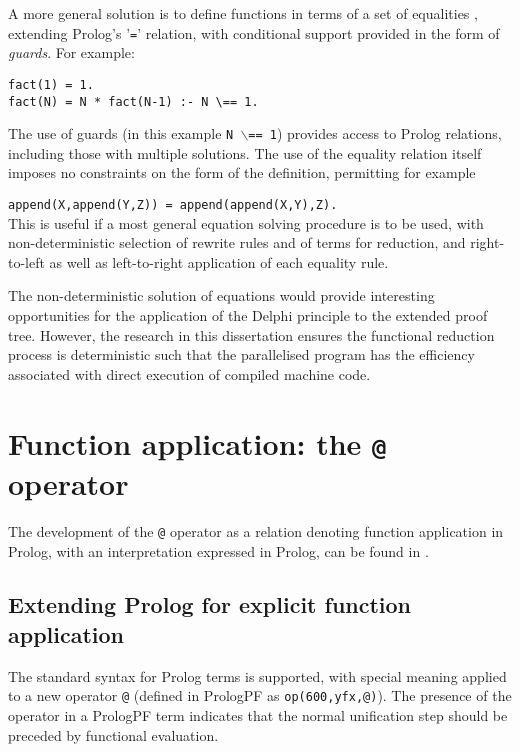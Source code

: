 A more general solution is to define functions in terms of a set of
equalities \cite{Han94, Nai91},
extending Prolog's '\texttt{=}' relation, with conditional
support provided in the form of \textit{guards}.  For example:

\begin{verbatim}
fact(1) = 1.
fact(N) = N * fact(N-1) :- N \== 1.
\end{verbatim}

The use of guards (in this example \texttt{N $\backslash$== 1})
provides access to Prolog relations, including those
with multiple solutions.  The use of the equality relation itself imposes
no constraints on the form of the definition, permitting for example

\texttt{append(X,append(Y,Z)) = append(append(X,Y),Z).}\\

This is useful if a most general equation solving procedure is to
be used, with non-deterministic selection of rewrite rules and
of terms for reduction, and right-to-left as well as left-to-right
application of each equality rule.

The non-deterministic solution of equations would provide interesting
opportunities for the application of the Delphi principle to the
extended proof tree.  However, the research in this dissertation
ensures the functional reduction process is deterministic such that
the parallelised program has the efficiency associated with
direct execution
of compiled machine code.

\section{Function application: the \texttt{@} operator} %
\label{application}
\enlargethispage{-2\baselineskip}  %

The development of the \texttt{@} operator as a relation denoting function
application in Prolog, with an interpretation expressed in Prolog, can be
found in \cite{Clo97}.

\subsection{Extending Prolog for explicit function application}

The standard syntax for Prolog terms is supported, with special meaning 
applied to a new operator \texttt{@} (defined in PrologPF as
\texttt{op(600,yfx,@)}).  The presence of the operator in a PrologPF
term indicates that the normal unification step should be preceded by
functional evaluation.

